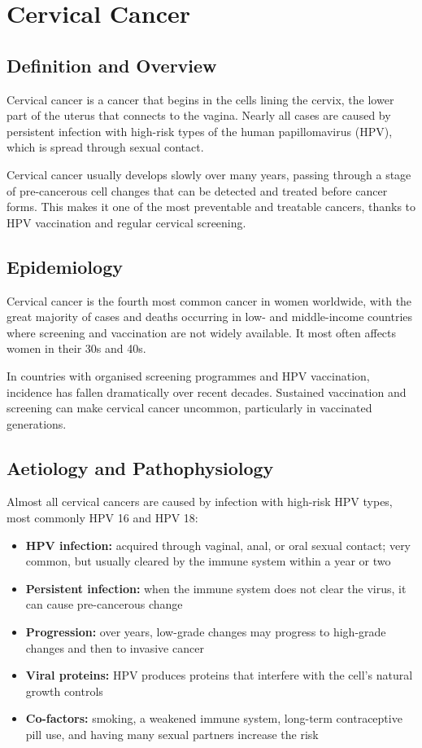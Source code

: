 \chapter{Cervical Cancer}

\section*{Definition and Overview}
Cervical cancer is a cancer that begins in the cells lining the cervix, the lower part of the uterus that connects to the vagina. Nearly all cases are caused by persistent infection with high-risk types of the human papillomavirus (HPV), which is spread through sexual contact.

Cervical cancer usually develops slowly over many years, passing through a stage of pre-cancerous cell changes that can be detected and treated before cancer forms. This makes it one of the most preventable and treatable cancers, thanks to HPV vaccination and regular cervical screening.

\section*{Epidemiology}
Cervical cancer is the fourth most common cancer in women worldwide, with the great majority of cases and deaths occurring in low- and middle-income countries where screening and vaccination are not widely available. It most often affects women in their 30s and 40s.

In countries with organised screening programmes and HPV vaccination, incidence has fallen dramatically over recent decades. Sustained vaccination and screening can make cervical cancer uncommon, particularly in vaccinated generations.

\section*{Aetiology and Pathophysiology}
Almost all cervical cancers are caused by infection with high-risk HPV types, most commonly HPV 16 and HPV 18:

\begin{itemize}
    \item \textbf{HPV infection:} acquired through vaginal, anal, or oral sexual contact; very common, but usually cleared by the immune system within a year or two
    \item \textbf{Persistent infection:} when the immune system does not clear the virus, it can cause pre-cancerous change
    \item \textbf{Progression:} over years, low-grade changes may progress to high-grade changes and then to invasive cancer
    \item \textbf{Viral proteins:} HPV produces proteins that interfere with the cell's natural growth controls
    \item \textbf{Co-factors:} smoking, a weakened immune system, long-term contraceptive pill use, and having many sexual partners increase the risk
\end{itemize}

